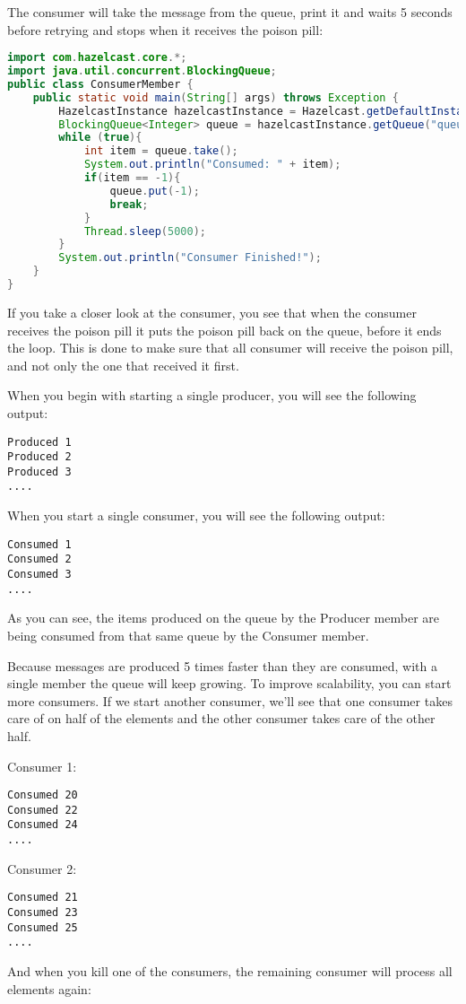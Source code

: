 The consumer will take the message from the queue, print it and waits 5 seconds before retrying and stops when it receives the poison pill:
\begin{lstlisting}[language=java]
import com.hazelcast.core.*;
import java.util.concurrent.BlockingQueue;
public class ConsumerMember {
    public static void main(String[] args) throws Exception {
        HazelcastInstance hazelcastInstance = Hazelcast.getDefaultInstance();
        BlockingQueue<Integer> queue = hazelcastInstance.getQueue("queue");
        while (true){
            int item = queue.take();
            System.out.println("Consumed: " + item);
            if(item == -1){
                queue.put(-1);
                break;
            }     
            Thread.sleep(5000);            
        }
        System.out.println("Consumer Finished!");
    }
}
\end{lstlisting}
If you take a closer look at the consumer, you see that when the consumer receives the poison pill it puts the poison pill back on the queue, before it ends the loop. This is done to make sure that all consumer will receive the poison pill, and not only the one that received it first.

When you begin with starting a single producer, you will see the following output:
\begin{verbatim}
Produced 1
Produced 2
Produced 3
....
\end{verbatim}
When you start a single consumer, you will see the following output:
\begin{verbatim}
Consumed 1
Consumed 2
Consumed 3
....
\end{verbatim}
As you can see, the items produced on the queue by the Producer member are being consumed from that same queue by the Consumer member.

Because messages are produced 5 times faster than they are consumed, with a single member the queue will keep growing. To improve scalability, you can start more consumers. If we start another consumer, we'll see that one consumer takes care of on half of the elements and the other consumer takes care of the other half.

Consumer 1:
\begin{verbatim}
Consumed 20
Consumed 22
Consumed 24
....
\end{verbatim}
Consumer 2:
\begin{verbatim}
Consumed 21
Consumed 23
Consumed 25
....
\end{verbatim}
And when you kill one of the consumers, the remaining consumer will process all elements again:

